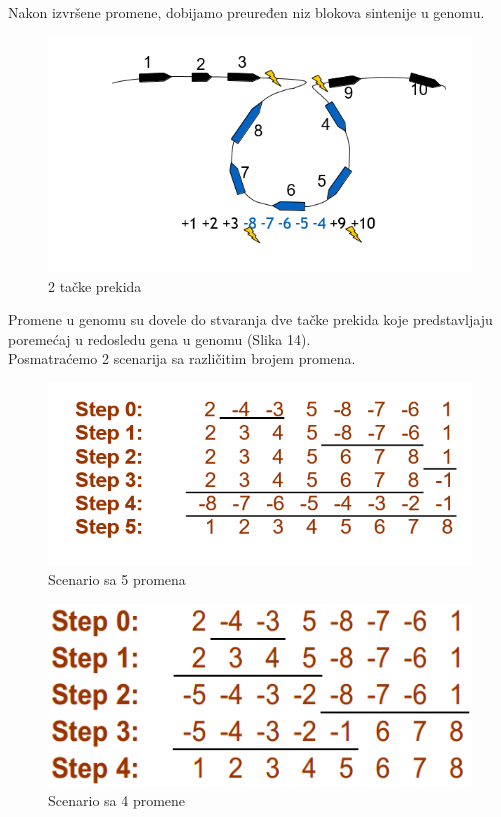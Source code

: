 \noindent Nakon izvršene promene, dobijamo preuređen niz blokova sintenije u genomu.\\

\begin{figure}[h!]
\centering
\includegraphics[scale=0.5]{poglavlja/6/slike/promene4.PNG}
\caption{2 tačke prekida}
\label{slika:X}
\end{figure}

\noindent Promene u genomu su dovele do stvaranja dve tačke prekida koje predstavljaju poremećaj u redosledu gena u genomu (Slika 14).\\

\noindent Posmatraćemo 2 scenarija sa različitim brojem promena.\\

\begin{figure}[h!]
\centering
\includegraphics[scale=0.6]{poglavlja/6/slike/scenario5.PNG}
\caption{Scenario sa 5 promena}
\label{slika:X}
\end{figure}

\begin{figure}[h!]
\centering
\includegraphics[scale=0.7]{poglavlja/6/slike/scenario4.PNG}
\caption{Scenario sa 4 promene}
\label{slika:X}
\end{figure}

